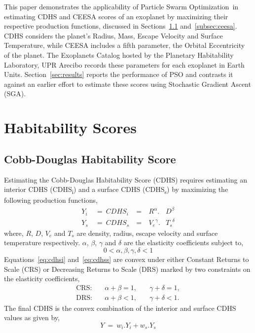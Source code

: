 \documentclass[10pt]{article}
\newcommand{\pso}{Particle Swarm Optimization}
\begin{document}
This paper demonstrates the applicability of \pso\ in estimating CDHS and CEESA scores of an exoplanet by maximizing
their respective production functions, discussed in Sections~\ref{subsec:cdhs} and~\ref{subsec:ceesa}. CDHS considers
the planet's Radius, Mass, Escape Velocity and Surface Temperature, while CEESA includes a fifth parameter, the Orbital
Eccentricity of the planet. The Exoplanets Catalog hosted by the Planetary Habitability Laboratory, UPR Arecibo records
these parameters for each exoplanet in Earth Units. Section~\ref{sec:results} reports the performance of PSO and
contrasts it against an earlier effort to estimate these scores using Stochastic Gradient Ascent (SGA).


\section{Habitability Scores}

\subsection{Cobb-Douglas Habitability Score}\label{subsec:cdhs}
Estimating the Cobb-Douglas Habitability Score (CDHS) requires estimating an interior CDHS (CDHS\textsubscript{i}) and a
surface CDHS (CDHS\textsubscript{s}) by maximizing the following production functions,
\begin{subequations}
  \begin{alignat}{4}
    Y_i\ &=\ {CDHS}_i\ &=&\ R^\alpha.&D^\beta\label{eq:cdhsi}\\
    Y_s\ &=\ {CDHS}_s\ &=&\ {V_e}^\gamma.&{T_s}^\delta\label{eq:cdhss}
  \end{alignat}
\end{subequations}
where, $R$, $D$, $V_e$ and $T_s$ are density, radius, escape velocity and surface temperature respectively. $\alpha$,
$\beta$, $\gamma$ and $\delta$ are the elasticity coefficients subject to,
\begin{equation}
  0 < \alpha,\beta,\gamma,\delta < 1
\end{equation}
Equations~\ref{eq:cdhsi} and~\ref{eq:cdhss} are convex under either Constant Returns to Scale (CRS) or Decreasing
Returns to Scale (DRS) marked by two constraints on the elasticity coefficients,
\begin{subequations}
  \begin{alignat}{3}
    \text{CRS:} & \quad\alpha+\beta = 1,&\quad\gamma+\delta = 1,\\
    \text{DRS:} & \quad\alpha+\beta < 1,&\quad\gamma+\delta < 1.
  \end{alignat}
\end{subequations}
The final CDHS is the convex combination of the interior and surface CDHS values as given by,
\begin{equation}
  Y\ =\ w_i.Y_i + w_s.Y_s
\end{equation}
\end{document}
